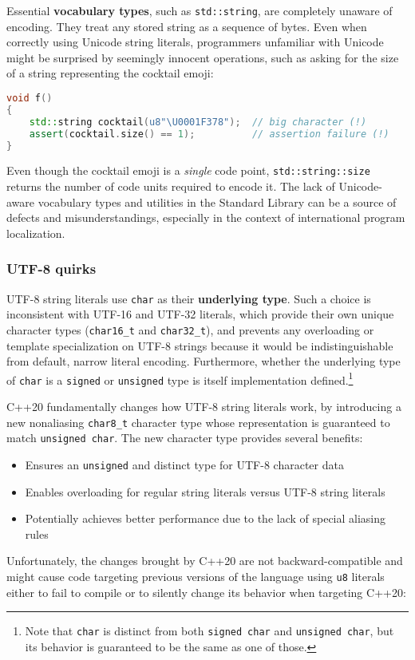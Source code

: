 Essential \textbf{vocabulary types}, such as \texttt{std::string}, are
completely unaware of encoding. They treat any stored string as a
sequence of bytes. Even when correctly using Unicode string literals,
programmers unfamiliar with Unicode might be surprised by seemingly
innocent operations, such as asking for the size of a string
representing the cocktail emoji:

\begin{lstlisting}[language=C++]
void f()
{
    std::string cocktail(u8"\U0001F378");  // big character (!)
    assert(cocktail.size() == 1);          // assertion failure (!)
}
\end{lstlisting}

\noindent Even though the cocktail emoji is a \emph{single} code point,
\texttt{std::string::size} returns the number of code units required to
encode it. The lack of Unicode-aware vocabulary types and utilities in
the Standard Library can be a source of defects and misunderstandings,
especially in the context of international program localization.

\subsubsection[UTF-8 quirks]{UTF-8 quirks}\label{utf-8-quirks}

UTF-8 string literals use \texttt{char} as their \textbf{underlying type}. Such a
choice is inconsistent with UTF-16 and UTF-32 literals, which provide
their own unique character types (\texttt{char16\_t} and
\texttt{char32\_t}), and prevents any overloading or template
specialization on UTF-8 strings because it would be indistinguishable from
default, narrow literal encoding. Furthermore, whether the underlying
type of \texttt{char} is a \texttt{signed} or \texttt{unsigned} type is
itself implementation defined.{\cprotect\footnote{Note that
\texttt{char} is distinct from both \texttt{signed}~\texttt{char} and
\texttt{unsigned}~\texttt{char}, but its behavior is guaranteed to be
  the same as one of those.}}

C++20
fundamentally changes how UTF-8 string literals work, by introducing a
new nonaliasing \texttt{char8\_t} character type whose representation
is guaranteed to match \texttt{unsigned}~\texttt{char}. The new
character type provides several benefits:
\begin{itemize}
\item{Ensures an \texttt{unsigned} and distinct type for UTF-8 character data}
\item{Enables overloading for regular string literals versus UTF-8 string literals}
\item{Potentially achieves better performance due to the lack of special aliasing rules}
\end{itemize}
Unfortunately, the changes brought by C++20 are not
backward-compatible and might cause code targeting previous versions
of the language using \texttt{u8} literals either to fail to compile
or to silently change its behavior when targeting C++20:

